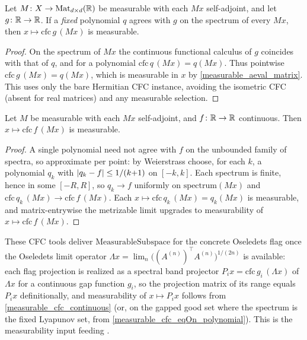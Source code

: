 \begin{theorem}\label{measurable_cfc_eqOn_polynomial}
  \leanok
  Let $M\colon X\to\mathrm{Mat}_{d\times d}(\mathbb{R})$ be measurable with each $M x$
  self-adjoint, and let $g\colon\mathbb{R}\to\mathbb{R}$. If a \emph{fixed} polynomial $q$
  agrees with $g$ on the spectrum of every $M x$, then
  $x\mapsto\mathrm{cfc}\,g\,(M x)$ is measurable.
  \begin{proof}\leanok
  On the spectrum of $M x$ the continuous functional calculus of $g$ coincides
  with that of $q$, and for a polynomial $\mathrm{cfc}\,q\,(M x)=q(M x)$. Thus
  pointwise $\mathrm{cfc}\,g\,(M x)=q(M x)$, which is measurable in $x$ by
  \ref{measurable_aeval_matrix}. This uses only the bare Hermitian CFC instance,
  avoiding the isometric CFC (absent for real matrices) and any measurable
  selection.
  \end{proof}
\end{theorem}

\begin{theorem}\label{measurable_cfc_continuous}
  \leanok
  Let $M$ be measurable with each $M x$ self-adjoint, and $f\colon\mathbb{R}\to\mathbb{R}$
  continuous. Then $x\mapsto\mathrm{cfc}\,f\,(M x)$ is measurable.
  \begin{proof}\leanok
  A single polynomial need not agree with $f$ on the unbounded family of spectra,
  so approximate per point: by Weierstrass choose, for each $k$, a polynomial
  $q_k$ with $\left\lvert q_k-f \right\rvert\le 1/(k{+}1)$ on $[-k,k]$. Each spectrum is finite,
  hence in some $[-R,R]$, so $q_k\to f$ uniformly on $\mathrm{spectrum}(M x)$ and
  $\mathrm{cfc}\,q_k\,(M x)\to\mathrm{cfc}\,f\,(M x)$. Each
  $x\mapsto\mathrm{cfc}\,q_k\,(M x)=q_k(M x)$ is measurable, and matrix-entrywise
  the metrizable limit upgrades to measurability of $x\mapsto\mathrm{cfc}\,f\,(M x)$.
  \end{proof}
\end{theorem}

These CFC tools deliver $\mathrm{MeasurableSubspace}$ for the concrete Oseledets
flag once the Oseledets limit operator
$\Lambda x=\lim_n\bigl((A^{(n)})^{\top} A^{(n)}\bigr)^{1/(2n)}$ is available: each
flag projection is realized as a spectral band projector $P_i x=\mathrm{cfc}\,g_i\,(\Lambda x)$
of $\Lambda x$ for a continuous gap function $g_i$, so the projection matrix of
its range equals $P_i x$ definitionally, and measurability of $x\mapsto P_i x$
follows from \ref{measurable_cfc_continuous} (or, on the gapped good set where
the spectrum is the fixed Lyapunov set, from \ref{measurable_cfc_eqOn_polynomial}).
This is the measurability input feeding .
